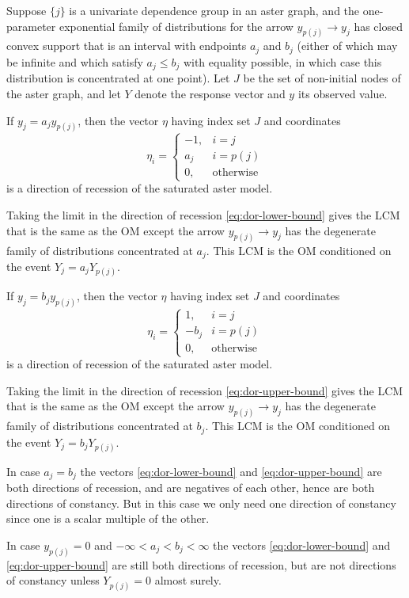 \begin{theorem} \label{th:dor-arrow}
Suppose $\{j\}$ is a univariate dependence group in an aster graph, and
the one-parameter exponential family of distributions for the arrow
$y_{p(j)} \longrightarrow y_j$ has closed convex support that is an
interval with endpoints $a_j$ and $b_j$ (either of which may be infinite and
which satisfy $a_j \le b_j$ with equality possible, in which case this
distribution is concentrated at one point).  Let $J$
be the set of non-initial nodes of the aster graph,
and let $Y$ denote the response vector and $y$ its observed value.

If $y_j = a_j y_{p(j)}$, then the vector $\eta$ having index set $J$
and coordinates
\begin{equation} \label{eq:dor-lower-bound}
   \eta_i = \begin{cases} -1, & i = j \\ a_j & i = p(j) \\
   0, & \text{otherwise} \end{cases}
\end{equation}
is a direction of recession of the saturated aster model.

Taking the limit in the direction of recession \eqref{eq:dor-lower-bound}
gives the LCM that is the same as the OM except the arrow
$y_{p(j)} \longrightarrow y_j$ has the degenerate family of distributions
concentrated at $a_j$.
This LCM is the OM conditioned on the event $Y_j = a_j Y_{p(j)}$.

If $y_j = b_j y_{p(j)}$, then the vector $\eta$ having index set $J$
and coordinates
\begin{equation} \label{eq:dor-upper-bound}
   \eta_i = \begin{cases} 1, & i = j \\ - b_j & i = p(j) \\
   0, & \text{otherwise} \end{cases}
\end{equation}
is a direction of recession of the saturated aster model.

Taking the limit in the direction of recession \eqref{eq:dor-upper-bound}
gives the LCM that is the same as the OM except the arrow
$y_{p(j)} \longrightarrow y_j$ has the degenerate family of distributions
concentrated at $b_j$.
This LCM is the OM conditioned on the event $Y_j = b_j Y_{p(j)}$.

In case $a_j = b_j$ the vectors \eqref{eq:dor-lower-bound}
and \eqref{eq:dor-upper-bound} are both directions of recession,
and are negatives of each other, hence are both directions of constancy.
But in this case we only need one direction of constancy since one
is a scalar multiple of the other.

In case $y_{p(j)} = 0$  and $-\infty < a_j < b_j < \infty$
the vectors \eqref{eq:dor-lower-bound}
and \eqref{eq:dor-upper-bound} are still both directions of recession,
but are not directions of constancy unless $Y_{p(j)} = 0$ almost surely.
\end{theorem}
